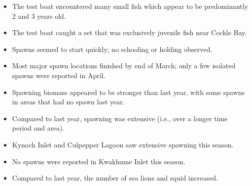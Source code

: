 \begin{itemize}
\item The test boat encountered many small fish which appear to be predominantly 2 and 3 years old.
\item The test boat caught a set that was exclusively juvenile fish near Cockle Bay.
\item Spawns seemed to start quickly; no schooling or holding observed.
\item Most major spawn locations finished by end of March; only a few isolated spawns were reported in April.
\item Spawning biomass appeared to be stronger than last year, with some spawns in areas that had no spawn last year.
\item Compared to last year, spawning was extensive (i.e., over a longer time period and area).
\item Kynoch Inlet and Culpepper Lagoon saw extensive spawning this season.
\item No spawns were reported in Kwakhume Inlet this season.
\item Compared to last year, the number of sea lions and squid increased.
\end{itemize}